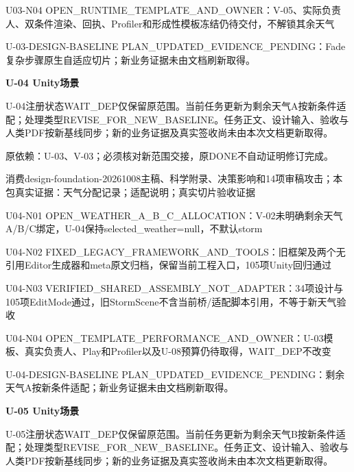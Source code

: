 \documentclass[11pt,a4paper]{article}
\newcommand{\reviewsection}[1]{\par\Needspace{5\baselineskip}\vspace{10pt}\begin{center}{\titlelatin\titlecjk\bfseries\fontsize{14}{20}\selectfont #1}\end{center}}
\begin{document}
U03-\allowbreak{}N04 OPEN\_\allowbreak{}RUNTIME\_\allowbreak{}TEMPLATE\_\allowbreak{}AND\_\allowbreak{}OWNER：V-\allowbreak{}05、实际负责人、双条件渲染、回执、Profiler和形成性模板冻结仍待交付，不解锁其余天气


U-\allowbreak{}03-\allowbreak{}DESIGN-\allowbreak{}BASELINE PLAN\_\allowbreak{}UPDATED\_\allowbreak{}EVIDENCE\_\allowbreak{}PENDING：Fade复杂步骤原生自适应切片；新业务证据未由文档刷新取得。


\reviewsection{U-\allowbreak{}04 Unity场景}
U-\allowbreak{}04注册状态WAIT\_\allowbreak{}DEP仅保留原范围。当前任务更新为剩余天气A按新条件适配；处理类型REVISE\_\allowbreak{}FOR\_\allowbreak{}NEW\_\allowbreak{}BASELINE。任务正文、设计输入、验收与人类PDF按新基线同步；新的业务证据及真实签收尚未由本次文档更新取得。


原依赖：U-\allowbreak{}03、V-\allowbreak{}03；必须核对新范围交接，原DONE不自动证明修订完成。


消费design-\allowbreak{}foundation-\allowbreak{}20261008主稿、科学附录、决策影响和14项审稿攻击；本包真实证据：天气分配记录；适配说明；真实切片验收证据


U04-\allowbreak{}N01 OPEN\_\allowbreak{}WEATHER\_\allowbreak{}A\_\allowbreak{}B\_\allowbreak{}C\_\allowbreak{}ALLOCATION：V-\allowbreak{}02未明确剩余天气A/\allowbreak{}B/\allowbreak{}C绑定，U-\allowbreak{}04保持selected\_\allowbreak{}weather=null，不默认storm


U04-\allowbreak{}N02 FIXED\_\allowbreak{}LEGACY\_\allowbreak{}FRAMEWORK\_\allowbreak{}AND\_\allowbreak{}TOOLS：旧框架及两个无引用Editor生成器和meta原文归档，保留当前工程入口，105项Unity回归通过


U04-\allowbreak{}N03 VERIFIED\_\allowbreak{}SHARED\_\allowbreak{}ASSEMBLY\_\allowbreak{}NOT\_\allowbreak{}ADAPTER：34项设计与105项EditMode通过，旧StormScene不含当前桥/\allowbreak{}适配脚本引用，不等于新天气验收


U04-\allowbreak{}N04 OPEN\_\allowbreak{}TEMPLATE\_\allowbreak{}PERFORMANCE\_\allowbreak{}AND\_\allowbreak{}OWNER：U-\allowbreak{}03模板、真实负责人、Play和Profiler以及U-\allowbreak{}08预算仍待取得，WAIT\_\allowbreak{}DEP不改变


U-\allowbreak{}04-\allowbreak{}DESIGN-\allowbreak{}BASELINE PLAN\_\allowbreak{}UPDATED\_\allowbreak{}EVIDENCE\_\allowbreak{}PENDING：剩余天气A按新条件适配；新业务证据未由文档刷新取得。


\reviewsection{U-\allowbreak{}05 Unity场景}
U-\allowbreak{}05注册状态WAIT\_\allowbreak{}DEP仅保留原范围。当前任务更新为剩余天气B按新条件适配；处理类型REVISE\_\allowbreak{}FOR\_\allowbreak{}NEW\_\allowbreak{}BASELINE。任务正文、设计输入、验收与人类PDF按新基线同步；新的业务证据及真实签收尚未由本次文档更新取得。
\end{document}
